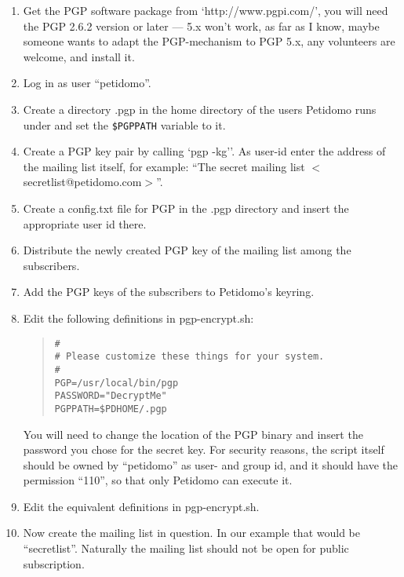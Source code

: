 \documentclass[a4paper,10pt]{scrreprt}
\newcommand{\file}[1]{{\sf #1}}
\begin{document}
\begin{enumerate}

\item Get the PGP software package from `http://www.pgpi.com/', you
will need the PGP 2.6.2 version or later --- 5.x won't work, as far as
I know, maybe someone wants to adapt the PGP-mechanism to PGP 5.x, any
volunteers are welcome, and install it.

\item Log in as user ``petidomo''.

\item Create a directory \file{.pgp} in the home directory of the
users Petidomo runs under and set the {\tt \$PGPPATH} variable to it.

\item Create a PGP key pair by calling `pgp -kg''. As user-id enter
the address of the mailing list itself, for example: ``The secret
mailing list $<$secretlist@petidomo.com$>$''.

\item Create a \file{config.txt} file for PGP in the \file{.pgp}
directory and insert the appropriate user id there.

\item Distribute the newly created PGP key of the mailing list among
the subscribers.

\item Add the PGP keys of the subscribers to Petidomo's keyring.

\item Edit the following definitions in \file{pgp-encrypt.sh}:

\begin{quote}
\begin{verbatim}
#
# Please customize these things for your system.
#
PGP=/usr/local/bin/pgp
PASSWORD="DecryptMe"
PGPPATH=$PDHOME/.pgp
\end{verbatim}
\end{quote}

You will need to change the location of the PGP binary and insert the
password you chose for the secret key. For security reasons, the
script itself should be owned by ``petidomo'' as user- and group id,
and it should have the permission ``110'', so that only Petidomo can
execute it.

\item Edit the equivalent definitions in \file{pgp-encrypt.sh}.

\item Now create the mailing list in question. In our example that
would be ``secretlist''. Naturally the mailing list should not be open
for public subscription.


\end{enumerate}
\end{document}

